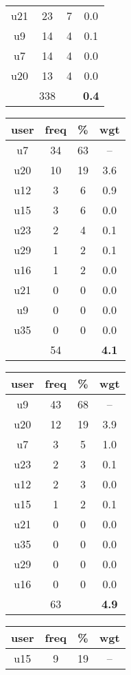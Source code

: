 \begin{table}
\begin{tabular}{ |c|c|c|c| }
	u21 & 23 & 7 & 0.0 \\
	u9 & 14 & 4 & 0.1 \\
	u7 & 14 & 4 & 0.0 \\
	u20 & 13 & 4 & 0.0 \\
	 & 338 & & \textbf{0.4} \\
	\hline
\end{tabular}
\begin{tabular}{ |c|c|c|c| }
	\hline
	\textbf{user} & \textbf{freq} & \textbf{\%} & \textbf{wgt} \\
	\hline
	u7 & 34 & 63 & -- \\
	u20 & 10 & 19 & 3.6 \\
	u12 & 3 & 6 & 0.9 \\
	u15 & 3 & 6 & 0.0 \\
	u23 & 2 & 4 & 0.1 \\
	u29 & 1 & 2 & 0.1 \\
	u16 & 1 & 2 & 0.0 \\
	u21 & 0 & 0 & 0.0 \\
	u9 & 0 & 0 & 0.0 \\
	u35 & 0 & 0 & 0.0 \\
	 & 54 & & \textbf{4.1} \\
	\hline
\end{tabular}
\begin{tabular}{ |c|c|c|c| }
	\hline
	\textbf{user} & \textbf{freq} & \textbf{\%} & \textbf{wgt} \\
	\hline
	u9 & 43 & 68 & -- \\
	u20 & 12 & 19 & 3.9 \\
	u7 & 3 & 5 & 1.0 \\
	u23 & 2 & 3 & 0.1 \\
	u12 & 2 & 3 & 0.0 \\
	u15 & 1 & 2 & 0.1 \\
	u21 & 0 & 0 & 0.0 \\
	u35 & 0 & 0 & 0.0 \\
	u29 & 0 & 0 & 0.0 \\
	u16 & 0 & 0 & 0.0 \\
	 & 63 & & \textbf{4.9} \\
	\hline
\end{tabular}
\begin{tabular}{ |c|c|c|c| }
	\hline
	\textbf{user} & \textbf{freq} & \textbf{\%} & \textbf{wgt} \\
	\hline
	u15 & 9 & 19 & -- \\

\end{tabular}
\end{table}
